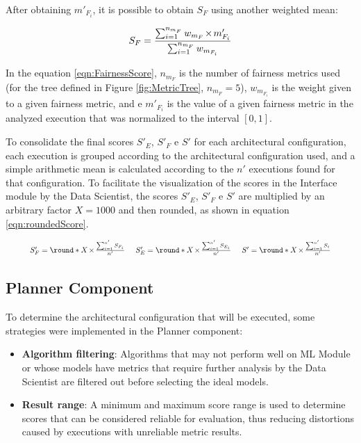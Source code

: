 \documentclass[sigconf]{acmart}
\DeclarePairedDelimiter{\round}\lfloor\rceil
\let\oldtimes\times
\def\times{{\mkern1mu\oldtimes\mkern1mu}}
\begin{document}
After obtaining $m'_{F_i}$, it is possible to obtain $S_F$ using another weighted mean:

\begin{equation}
\label{eqn:FairnessScore}
	\begin{aligned}
	S_{F} = \frac{\sum_{i=1}^{n_{m_F}} w_{m_{F}} \times m'_{F_{i}}}{\sum_{i=1}^{n_{m_F}} w_{m_{F_i}}}
	\end{aligned}
\end{equation}

In the equation \ref{eqn:FairnessScore}, $n_{m_F}$ is the number of fairness metrics used (for the tree defined in Figure \ref{fig:MetricTree}, $n_{m_F} = 5$), $w_{m_{F_i}}$ is the weight given to a given fairness metric, and e $m'_{F_{i}}$ is the value of a given fairness metric in the analyzed execution that was normalized to the interval $\left[0,1 \right]$. 

To consolidate the final scores $S'_E$, $S'_F$ e $S'$ for each architectural configuration, each execution is grouped according to the architectural configuration used, and a simple arithmetic mean is calculated according to the $n'$ executions found for that configuration. To facilitate the visualization of the scores in the Interface module by the Data Scientist, the scores $S'_E$, $S'_F$ e $S'$ are multiplied by an arbitrary factor $X = 1000$ and then rounded, as shown in equation \ref{eqn:roundedScore}.

\begin{equation}
\label{eqn:roundedScore}
\resizebox{0.9\hsize}{!}{$
	S'_F = \round*{X \times \frac{\sum_{i=1}^{n'} S_{F_i}}{n'}}\;\;\;\;\;
	S'_E = \round*{X \times \frac{\sum_{i=1}^{n'} S_{E_i}}{n'}}\;\;\;\;\;
	S' = \round*{X \times \frac{\sum_{i=1}^{n'} S_i}{n'}}
$}
\end{equation}

\subsection{Planner Component}

To determine the architectural configuration that will be executed, some strategies were implemented in the Planner component:

\begin{itemize}
\item \textbf{Algorithm filtering}: Algorithms that may not perform well on ML Module or whose models have metrics that require further analysis by the Data Scientist are filtered out before selecting the ideal models.
\item \textbf{Result range}: A minimum and maximum score range is used to determine scores that can be considered reliable for evaluation, thus reducing distortions caused by executions with unreliable metric results.
\end{itemize}
\end{document}
